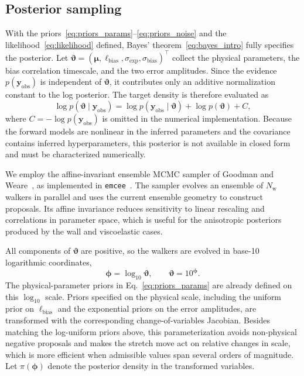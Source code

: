 \documentclass{elsarticle}
\renewcommand{\vec}[1]{\boldsymbol{#1}}
\newcommand{\params}{\boldsymbol{\mu}}
\begin{document}
\subsection{Posterior sampling}
\label{subsec:posterior}

With the priors~\eqref{eq:priors_params}--\eqref{eq:priors_noise} and
the likelihood~\eqref{eq:likelihood} defined, Bayes'
theorem~\eqref{eq:bayes_intro} fully specifies the posterior. Let
$\boldsymbol{\vartheta}=(\params,\ell_{\mathrm{bias}},
\sigma_{\mathrm{exp}},\sigma_{\mathrm{bias}})^{\top}$ collect the
physical parameters, the bias correlation timescale, and the two error
amplitudes. Since the evidence $p(\vec{y}_{\mathrm{obs}})$ is
independent of $\boldsymbol{\vartheta}$, it contributes only an additive
normalization constant to the log posterior. The target density is
therefore evaluated as
\begin{equation}
\log p(\boldsymbol{\vartheta}\mid \vec{y}_{\mathrm{obs}})
=
\log p(\vec{y}_{\mathrm{obs}} \mid \boldsymbol{\vartheta})
+
\log p(\boldsymbol{\vartheta})
+
C,
\label{eq:log_posterior}
\end{equation}
where $C=-\log p(\vec{y}_{\mathrm{obs}})$ is omitted in the
numerical implementation. Because the forward models are nonlinear in
the inferred parameters and the covariance contains inferred
hyperparameters, this posterior is not available in closed form and must
be characterized numerically.

We employ the affine-invariant ensemble MCMC sampler of Goodman and
Weare~\cite{goodman2010ensemble}, as implemented in
\texttt{emcee}~\cite{foremanmackey2013emcee}. The sampler evolves an
ensemble of $N_{\mathrm{w}}$ walkers in parallel and uses the current
ensemble geometry to construct proposals. Its affine invariance reduces
sensitivity to linear rescaling and correlations in parameter space,
which is useful for the anisotropic posteriors produced by the wall and
viscoelastic cases.

All components of $\boldsymbol{\vartheta}$ are positive, so the walkers
are evolved in base-10 logarithmic coordinates,
\begin{equation}
\boldsymbol{\phi}=\log_{10}\boldsymbol{\vartheta},
\qquad
\boldsymbol{\vartheta}=10^{\boldsymbol{\phi}} .
\end{equation}
The physical-parameter priors in Eq.~\eqref{eq:priors_params} are already
defined on this $\log_{10}$ scale. Priors specified on the physical
scale, including the uniform prior on $\ell_{\mathrm{bias}}$ and the
exponential priors on the error amplitudes, are transformed with the
corresponding change-of-variables Jacobian. Besides matching the
log-uniform priors above, this parameterization avoids non-physical
negative proposals and makes the stretch move act on relative changes in
scale, which is more efficient when admissible values span several
orders of magnitude. Let $\pi(\boldsymbol{\phi})$ denote the posterior
density in the transformed variables.
\end{document}
